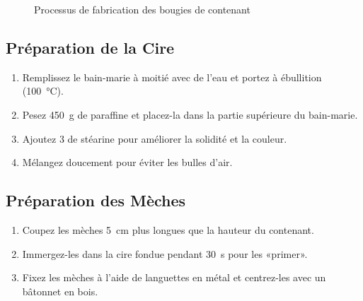 \documentclass[11pt,fleqn,onecolumn,oneside]{book}
\begin{document}
\begin{figure}
\caption{Processus de fabrication des bougies de contenant}
\label{fig:processus-bougies}
\end{figure}

\subsection*{Préparation de la Cire}
\begin{enumerate}
    \item Remplissez le bain-marie à moitié avec de l’eau et portez à ébullition (\SI{100}{\degreeCelsius}).
    \item Pesez \SI{450}{\gram} de paraffine et placez-la dans la partie supérieure du bain-marie.
    \item Ajoutez \SI{3}{\cuil} de stéarine pour améliorer la solidité et la couleur.
    \item Mélangez doucement pour éviter les bulles d’air.
\end{enumerate}

\subsection*{Préparation des Mèches}
\begin{enumerate}
    \item Coupez les mèches \SI{5}{\centi\metre} plus longues que la hauteur du contenant.
    \item Immergez-les dans la cire fondue pendant \SI{30}{\second} pour les «primer».
    \item Fixez les mèches à l’aide de languettes en métal et centrez-les avec un bâtonnet en bois.
\end{enumerate}
\end{document}
